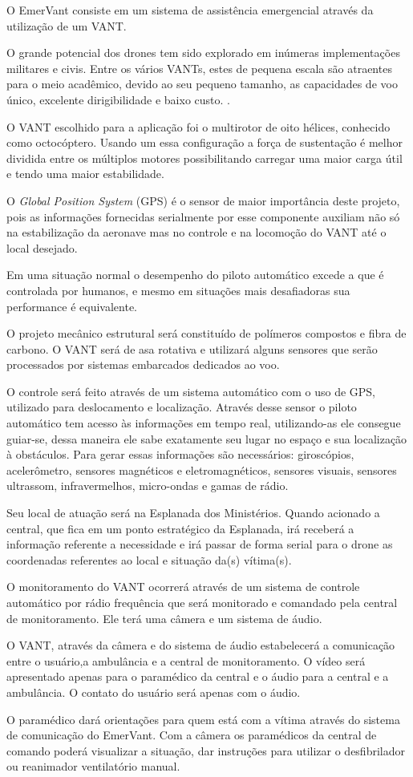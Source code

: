 O EmerVant consiste em um sistema de assistência emergencial através da utilização de um VANT.	

O grande potencial dos drones tem sido explorado em inúmeras implementações militares e civis. Entre os vários VANTs, estes de pequena escala são atraentes para o meio acadêmico, devido ao seu pequeno tamanho, as capacidades de voo único, excelente dirigibilidade e baixo custo. \cite{SDM}.

O VANT escolhido para a aplicação foi o multirotor de oito hélices, conhecido como octocóptero. Usando um essa configuração a força de sustentação é melhor dividida entre os múltiplos motores possibilitando carregar uma maior carga útil e tendo uma maior estabilidade.

O \textit{Global Position System} (GPS) é o sensor de maior importância deste projeto, pois as informações fornecidas serialmente por esse componente auxiliam não só na estabilização da aeronave mas no controle e na locomoção do VANT até o local desejado.

Em uma situação normal o desempenho do piloto automático excede a que é controlada por humanos, e mesmo em situações mais desafiadoras sua performance é equivalente.

O projeto mecânico estrutural será constituído de polímeros compostos e fibra de carbono. O VANT será de asa rotativa e utilizará alguns sensores que serão processados por sistemas embarcados dedicados ao voo. 

O controle será feito através de um sistema automático com o uso de GPS, utilizado para deslocamento e localização. Através desse sensor o piloto automático tem acesso às informações em tempo real, utilizando-as ele consegue guiar-se, dessa maneira ele sabe exatamente seu lugar no espaço e sua localização à obstáculos. Para gerar essas informações são necessários: giroscópios, acelerômetro, sensores magnéticos e eletromagnéticos, sensores visuais, sensores ultrassom, infravermelhos, micro-ondas e gamas de rádio. \cite{UDE}

Seu local de atuação será na Esplanada dos Ministérios. Quando acionado a central, que fica em um ponto estratégico da Esplanada, irá receberá a informação referente a necessidade e irá passar de forma serial para o drone as coordenadas referentes  ao local e situação da(s) vítima(s).

O monitoramento do VANT ocorrerá através de um sistema de controle automático por rádio frequência que será monitorado e comandado pela central de monitoramento. Ele terá uma câmera e um sistema de áudio.

O VANT, através da câmera e do sistema de áudio estabelecerá a comunicação entre o usuário,a ambulância e a central de monitoramento. O vídeo será apresentado apenas para o paramédico da central e o áudio para a central e a ambulância. O contato do usuário será apenas com o áudio.

O paramédico dará orientações para quem está com a vítima através do sistema de comunicação do EmerVant. Com a câmera os paramédicos da central de comando poderá visualizar a situação, dar instruções para utilizar o desfibrilador ou reanimador ventilatório manual. 
